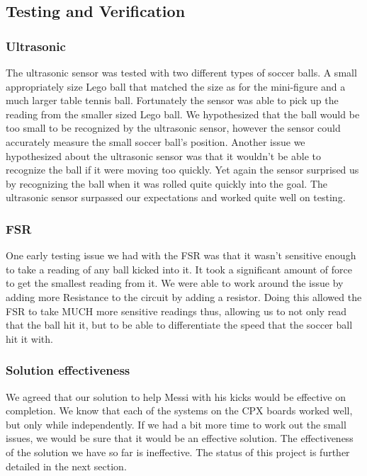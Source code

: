 \documentclass[12pt]{article}
\begin{document}
\subsection{Testing and Verification}

\subsubsection{Ultrasonic}

The ultrasonic sensor was tested with two different types of soccer balls. A small appropriately size Lego ball that matched the size as for the mini-figure and a much larger table tennis ball. Fortunately the sensor was able to pick up the reading from the smaller sized Lego ball. We hypothesized that the ball would be too small to be recognized by the ultrasonic sensor, however the sensor could accurately measure the small soccer ball's position. Another issue we hypothesized about the ultrasonic sensor was that it wouldn't be able to recognize the ball if it were moving too quickly. Yet again the sensor surprised us by recognizing the ball when it was rolled quite quickly into the goal. The ultrasonic sensor surpassed our expectations and worked quite well on testing.  

\subsubsection{FSR}

One early testing issue we had with the FSR was that it wasn't sensitive enough to take a reading of any ball kicked into it. It took a significant amount of force to get the smallest reading from it. We were able to work around the issue by adding more Resistance to the circuit by adding a resistor. Doing this allowed the FSR to take MUCH more sensitive readings thus, allowing us to not only read that the ball hit it, but to be able to differentiate the speed that the soccer ball hit it with. 

\subsubsection{Solution effectiveness}

We agreed that our solution to help Messi with his kicks would be effective on completion. We know that each of the systems on the CPX boards worked well, but only while independently. If we had a bit more time to work out the small issues, we would be sure that it would be an effective solution. The effectiveness of the solution we have so far is ineffective. The status of this project is further detailed in the next section. 
\end{document}
